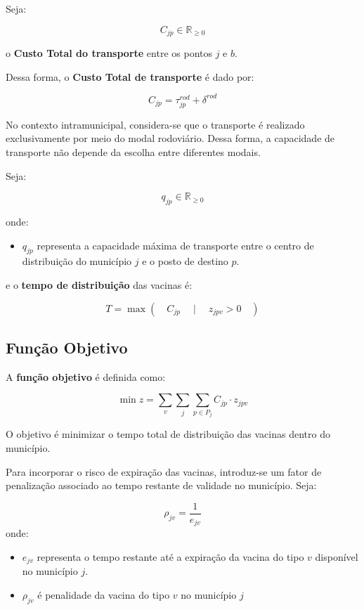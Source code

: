 Seja:

\begin{equation*}
C_{jp} \in \mathbb{R}_{\geq 0}
\end{equation*}

o \textbf{Custo Total do transporte} entre os pontos $j$ e $b$.

Dessa forma, o \textbf{Custo Total de transporte} é dado por:

\[
C_{jp} = \tau_{jp}^{rod} + \delta^{rod}
\]

No contexto intramunicipal, considera-se que o transporte é realizado exclusivamente por meio do modal rodoviário. Dessa forma, a capacidade de transporte não depende da escolha entre diferentes modais.

Seja:

\[
q_{jp} \in \mathbb{R}_{\geq 0}
\]

onde:
\begin{itemize}
    \item $q_{jp}$ representa a capacidade máxima de transporte entre o centro de distribuição do município $j$ e o posto de destino $p$.
\end{itemize}

e o \textbf{tempo de distribuição} das vacinas é:

\[
T = \max \left( \quad C_{jp} \quad \mid \quad z_{jpv} > 0 \quad \right)
\]

\subsection{Função Objetivo}

A \textbf{função objetivo} é definida como:

\begin{equation}
\min z = \sum_{v} \sum_{j} \sum_{p \in P_j} C_{jp} \cdot z_{jpv}
\label{intramunicipal_sem_penalidade}
\end{equation}

O objetivo é minimizar o tempo total de distribuição das vacinas dentro do município.

Para incorporar o risco de expiração das vacinas, introduz-se um fator de penalização associado ao tempo restante de validade no município. Seja:

\[
\rho_{jv} = \frac{1}{e_{jv}}
\]
onde:
\begin{itemize}
\item  $e_{jv}$ representa o tempo restante até a expiração da vacina do tipo $v$ disponível no município $j$.
\item $\rho_{jv}$ é penalidade da vacina do tipo $v$ no município $j$
\end{itemize}


